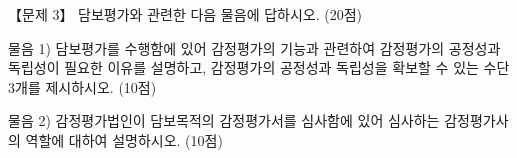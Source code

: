 \begin{longquestion}{【문제 3】}
담보평가와 관련한 다음 물음에 답하시오. (20점) \par
\medskip\noindent 물음 1) 담보평가를 수행함에 있어 감정평가의 기능과 관련하여 감정평가의 공정성과 독립성이 필요한 이유를 설명하고, 감정평가의 공정성과 독립성을 확보할 수 있는 수단 3개를 제시하시오. (10점) \par
\medskip\noindent 물음 2) 감정평가법인이 담보목적의 감정평가서를 심사함에 있어 심사하는 감정평가사의 역할에 대하여 설명하시오. (10점) \par
\end{longquestion}
